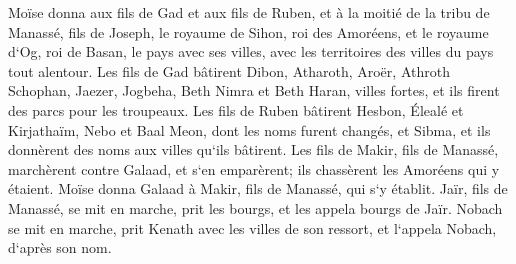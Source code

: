 \verse Moïse donna aux fils de Gad et aux fils de Ruben, et à la moitié de la tribu de Manassé, fils de Joseph, le royaume de Sihon, roi des Amoréens, et le royaume d`Og, roi de Basan, le pays avec ses villes, avec les territoires des villes du pays tout alentour. 
\verse Les fils de Gad bâtirent Dibon, Atharoth, Aroër, 
\verse Athroth Schophan, Jaezer, Jogbeha, 
\verse Beth Nimra et Beth Haran, villes fortes, et ils firent des parcs pour les troupeaux. 
\verse Les fils de Ruben bâtirent Hesbon, Élealé et Kirjathaïm, 
\verse Nebo et Baal Meon, dont les noms furent changés, et Sibma, et ils donnèrent des noms aux villes qu`ils bâtirent. 
\verse Les fils de Makir, fils de Manassé, marchèrent contre Galaad, et s`en emparèrent; ils chassèrent les Amoréens qui y étaient. 
\verse Moïse donna Galaad à Makir, fils de Manassé, qui s`y établit. 
\verse Jaïr, fils de Manassé, se mit en marche, prit les bourgs, et les appela bourgs de Jaïr. 
\verse Nobach se mit en marche, prit Kenath avec les villes de son ressort, et l`appela Nobach, d`après son nom. 

\chapter{}

